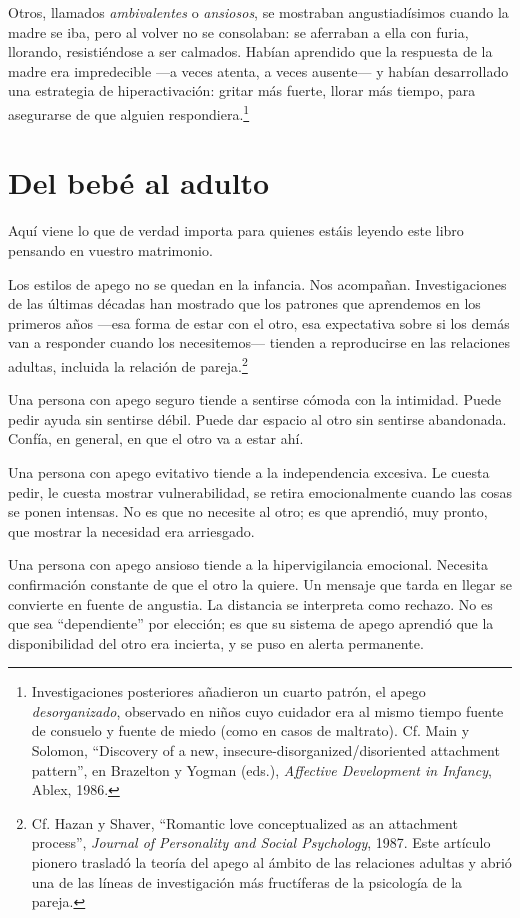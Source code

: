 Otros, llamados \textit{ambivalentes} o \textit{ansiosos}, se mostraban angustiadísimos cuando la madre se iba, pero al volver no se consolaban: se aferraban a ella con furia, llorando, resistiéndose a ser calmados. Habían aprendido que la respuesta de la madre era impredecible ---a veces atenta, a veces ausente--- y habían desarrollado una estrategia de hiperactivación: gritar más fuerte, llorar más tiempo, para asegurarse de que alguien respondiera.\footnote{Investigaciones posteriores añadieron un cuarto patrón, el apego \textit{desorganizado}, observado en niños cuyo cuidador era al mismo tiempo fuente de consuelo y fuente de miedo (como en casos de maltrato). Cf. Main y Solomon, ``Discovery of a new, insecure-disorganized/disoriented attachment pattern'', en Brazelton y Yogman (eds.), \textit{Affective Development in Infancy}, Ablex, 1986.}

\section{Del bebé al adulto}

Aquí viene lo que de verdad importa para quienes estáis leyendo este libro pensando en vuestro matrimonio.

Los estilos de apego no se quedan en la infancia. Nos acompañan. Investigaciones de las últimas décadas han mostrado que los patrones que aprendemos en los primeros años ---esa forma de estar con el otro, esa expectativa sobre si los demás van a responder cuando los necesitemos--- tienden a reproducirse en las relaciones adultas, incluida la relación de pareja.\footnote{Cf. Hazan y Shaver, ``Romantic love conceptualized as an attachment process'', \textit{Journal of Personality and Social Psychology}, 1987. Este artículo pionero trasladó la teoría del apego al ámbito de las relaciones adultas y abrió una de las líneas de investigación más fructíferas de la psicología de la pareja.}

Una persona con apego seguro tiende a sentirse cómoda con la intimidad. Puede pedir ayuda sin sentirse débil. Puede dar espacio al otro sin sentirse abandonada. Confía, en general, en que el otro va a estar ahí.

Una persona con apego evitativo tiende a la independencia excesiva. Le cuesta pedir, le cuesta mostrar vulnerabilidad, se retira emocionalmente cuando las cosas se ponen intensas. No es que no necesite al otro; es que aprendió, muy pronto, que mostrar la necesidad era arriesgado.

Una persona con apego ansioso tiende a la hipervigilancia emocional. Necesita confirmación constante de que el otro la quiere. Un mensaje que tarda en llegar se convierte en fuente de angustia. La distancia se interpreta como rechazo. No es que sea ``dependiente'' por elección; es que su sistema de apego aprendió que la disponibilidad del otro era incierta, y se puso en alerta permanente.

